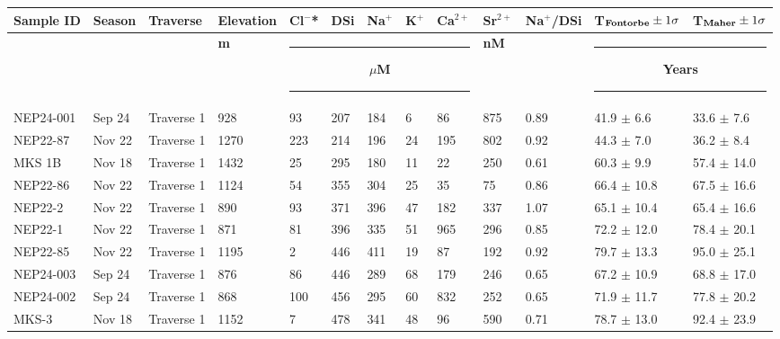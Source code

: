 \begin{landscape}
{\begin{longtable}{l l l l l l l l l l l l l}
    \hline
    \textbf{Sample ID}  &  \textbf{Season}  &  \textbf{Traverse}  &  \textbf{Elevation}  &  \textbf{Cl$^-$*}  &  \textbf{DSi}  &  \textbf{Na$^{+}$}  &  \textbf{K$^{+}$}  &  \textbf{Ca$^{2+}$}  &  \textbf{Sr$^{2+}$}  &  \textbf{Na$^{+}$/DSi}  & \textbf{T$_{\text{\textbf{Fontorbe}}} \pm 1\sigma$ }  &  \textbf{T$_{\text{\textbf{Maher}}} \pm 1\sigma$} \\
    \hline
      &   &   &  \textbf{m}  &  \multicolumn{5}{c}{\hspace{-0.35cm}\rule{2.5cm}{0.8pt} \hspace{0.3cm}\textbf{ $\mu$M } \hspace{0.3cm} \rule{2.5cm}{0.8pt}} & \multicolumn{1}{l}{\textbf{nM}} &  & \multicolumn{2}{c}{\hspace{-0.35cm}\rule{1.5cm}{0.8pt} \hspace{0.3cm}\textbf{ Years } \hspace{0.3cm} \rule{1.5cm}{0.8pt}}\\
    \hline
    \endhead
    \hline
    \endfoot
    \hline
    NEP24-001 & Sep 24 & Traverse 1 & 928 & 93 & 207 & 184 & 6 & 86 & 875 & 0.89 & 41.9 $\pm$ 6.6 & 33.6 $\pm$ 7.6 \\
    NEP22-87 & Nov 22 & Traverse 1 & 1270 & 223 & 214 & 196 & 24 & 195 & 802 & 0.92 & 44.3 $\pm$ 7.0 & 36.2 $\pm$ 8.4 \\
    MKS 1B & Nov 18 & Traverse 1 & 1432 & 25 & 295 & 180 & 11 & 22 & 250 & 0.61 & 60.3 $\pm$ 9.9 & 57.4 $\pm$ 14.0 \\
    NEP22-86 & Nov 22 & Traverse 1 & 1124 & 54 & 355 & 304 & 25 & 35 & 75 & 0.86 & 66.4 $\pm$ 10.8 & 67.5 $\pm$ 16.6 \\
    NEP22-2 & Nov 22 & Traverse 1 & 890 & 93 & 371 & 396 & 47 & 182 & 337 & 1.07 & 65.1 $\pm$ 10.4 & 65.4 $\pm$ 16.6 \\
    NEP22-1 & Nov 22 & Traverse 1 & 871 & 81 & 396 & 335 & 51 & 965 & 296 & 0.85 & 72.2 $\pm$ 12.0 & 78.4 $\pm$ 20.1 \\
    NEP22-85 & Nov 22 & Traverse 1 & 1195 & 2 & 446 & 411 & 19 & 87 & 192 & 0.92 & 79.7 $\pm$ 13.3 & 95.0 $\pm$ 25.1 \\
    NEP24-003 & Sep 24 & Traverse 1 & 876 & 86 & 446 & 289 & 68 & 179 & 246 & 0.65 & 67.2 $\pm$ 10.9 & 68.8 $\pm$ 17.0 \\
    NEP24-002 & Sep 24 & Traverse 1 & 868 & 100 & 456 & 295 & 60 & 832 & 252 & 0.65 & 71.9 $\pm$ 11.7 & 77.8 $\pm$ 20.2 \\
    MKS-3 & Nov 18 & Traverse 1 & 1152 & 7 & 478 & 341 & 48 & 96 & 590 & 0.71 & 78.7 $\pm$ 13.0 & 92.4 $\pm$ 23.9 \\

\end{longtable}}
\end{landscape}
